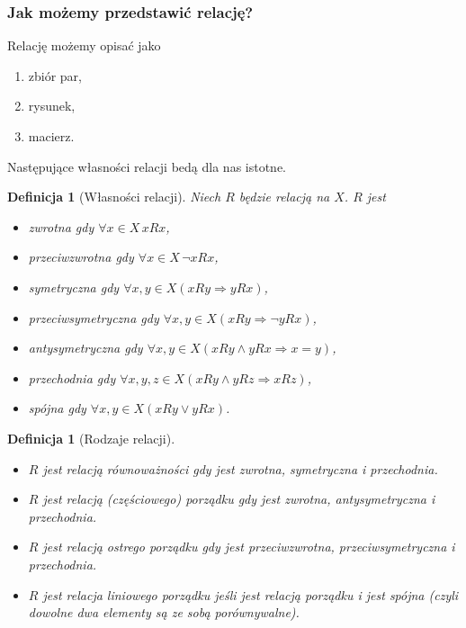 \documentclass[12pt]{article}
\newcommand{\imp}{\Rightarrow}
\newtheorem{dfn}[thm]{Definicja}
\begin{document}
\subsubsection{Jak możemy przedstawić relację?}

Relację możemy opisać jako
\begin{enumerate}
	\item zbiór par,
	\item rysunek,
	\item macierz.
\end{enumerate}

Następujące własności relacji bedą dla nas istotne.

\begin{dfn}[Własności relacji]
Niech $R$ będzie relacją na $X$. $R$ jest 
\begin{itemize}
	\item zwrotna gdy $\forall x\in X\, xRx$,
	\item przeciwzwrotna gdy $\forall x\in X\, \neg xRx$,
	\item symetryczna gdy $\forall x,y\in X(xRy \imp yRx)$,
	\item przeciwsymetryczna gdy $\forall x,y\in X(xRy \imp \neg yRx)$,
	\item antysymetryczna gdy $\forall x,y\in X(xRy \land yRx \imp x=y)$,
	\item przechodnia gdy $\forall x,y,z\in X (xRy\land yRz \imp xRz)$,
	\item spójna gdy $\forall x,y\in X(xRy \lor yRx)$.
\end{itemize}	
\end{dfn}

\begin{dfn}[Rodzaje relacji]
	\begin{itemize}
		\item $R$ jest relacją równoważności gdy jest zwrotna, symetryczna i przechodnia.
		\item $R$ jest relacją (częściowego) porządku gdy jest zwrotna, antysymetryczna i przechodnia.
		\item $R$ jest relacją ostrego porządku gdy jest przeciwzwrotna, przeciwsymetryczna i przechodnia.
		\item $R$ jest relacja liniowego porządku jeśli jest relacją porządku i jest spójna (czyli dowolne dwa elementy są ze sobą porównywalne).
	\end{itemize}
	
\end{dfn}
\end{document}
